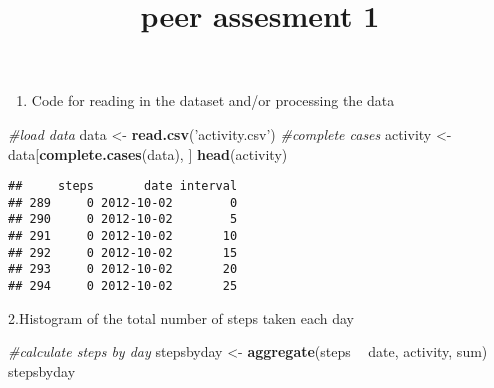 \documentclass[]{article}
\title{peer assesment 1}
\author{}
\date{}
\newenvironment{Shaded}{\begin{snugshade}}{\end{snugshade}}
\newcommand{\KeywordTok}[1]{\textcolor[rgb]{0.13,0.29,0.53}{\textbf{#1}}}
\newcommand{\StringTok}[1]{\textcolor[rgb]{0.31,0.60,0.02}{#1}}
\newcommand{\CommentTok}[1]{\textcolor[rgb]{0.56,0.35,0.01}{\textit{#1}}}
\newcommand{\OperatorTok}[1]{\textcolor[rgb]{0.81,0.36,0.00}{\textbf{#1}}}
\newcommand{\NormalTok}[1]{#1}
\providecommand{\tightlist}{%
  \setlength{\itemsep}{0pt}\setlength{\parskip}{0pt}}
\begin{document}
\maketitle

\begin{enumerate}
\def\labelenumi{\arabic{enumi}.}
\tightlist
\item
  Code for reading in the dataset and/or processing the data
\end{enumerate}

\begin{Shaded}
\begin{Highlighting}[]
\CommentTok{#load data}
\NormalTok{data <-}\StringTok{ }\KeywordTok{read.csv}\NormalTok{(}\StringTok{'activity.csv'}\NormalTok{)}
\CommentTok{#complete cases}
\NormalTok{activity <-}\StringTok{ }\NormalTok{data[}\KeywordTok{complete.cases}\NormalTok{(data), ]}
\KeywordTok{head}\NormalTok{(activity)}
\end{Highlighting}
\end{Shaded}

\begin{verbatim}
##     steps       date interval
## 289     0 2012-10-02        0
## 290     0 2012-10-02        5
## 291     0 2012-10-02       10
## 292     0 2012-10-02       15
## 293     0 2012-10-02       20
## 294     0 2012-10-02       25
\end{verbatim}

2.Histogram of the total number of steps taken each day

\begin{Shaded}
\begin{Highlighting}[]
\CommentTok{#calculate steps by day}
\NormalTok{stepsbyday <-}\StringTok{ }\KeywordTok{aggregate}\NormalTok{(steps }\OperatorTok{~}\StringTok{ }\NormalTok{date, activity, sum)}
\NormalTok{stepsbyday}
\end{Highlighting}
\end{Shaded}
\end{document}
